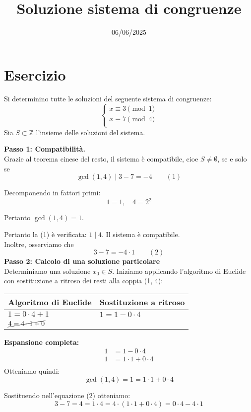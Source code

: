 \documentclass[12pt]{article}
\begin{document}
\title{Soluzione sistema di congruenze}
\date{06/06/2025}
\maketitle
\section*{Esercizio}
Si determinino tutte le soluzioni del seguente sistema di congruenze:
\[
\begin{cases}
x \equiv 3 \pmod{1} \\
x \equiv 7 \pmod{4} \\
\end{cases}
\]
Sia $S \subset \mathbb{Z}$ l'insieme delle soluzioni del sistema.

\textbf{Passo 1: Compatibilità.} \\ 
Grazie al teorema cinese del resto, il sistema è compatibile, cioe $S \neq \emptyset$, se e solo se
$$\gcd(1, 4) \mid 3 - 7 = -4 \qquad (1)$$

Decomponendo in fattori primi:
$$1 = 1, \quad 4 = 2^{2}$$

Pertanto $\gcd(1, 4) = 1$.

Pertanto la (1) è verificata: $1 \mid 4$. Il sistema è compatibile.\\
Inoltre, osserviamo che $$3 - 7 = -4 \cdot 1 \qquad (2)$$
\textbf{Passo 2: Calcolo di una soluzione particolare} \\
Determiniamo una soluzione $x_0 \in S$.
Iniziamo applicando l'algoritmo di Euclide con sostituzione a ritroso dei resti alla coppia (1, 4):
\begin{center}
\setlength{\arrayrulewidth}{0.5pt}
\begin{tabular}{|p{5cm}|p{9cm}|}
\hline
\textbf{Algoritmo di Euclide} & \textbf{Sostituzione a ritroso} \\
\hline
$1 = 0 \cdot  4 + 1$ & $1 = 1 - 0 \cdot  4$ \\
\hline
$\cancel{4 = 4 \cdot  1 + 0}$ & \\
\hline
\end{tabular}
\end{center}
\textbf{Espansione completa:}
\begin{align*}
1 &= 1 - 0\cdot4\\
1 &= 1\cdot1 + 0\cdot4\\
\end{align*}
Otteniamo quindi: $$\gcd(1, 4) = 1 = 1 \cdot 1 + 0 \cdot 4$$

Sostituendo nell'equazione (2) otteniamo:
$$3 - 7 = 4 = 1 \cdot 4 = 4 \cdot (1 \cdot 1 + 0 \cdot 4) = 0 \cdot 4 - 4 \cdot 1$$
\end{document}

